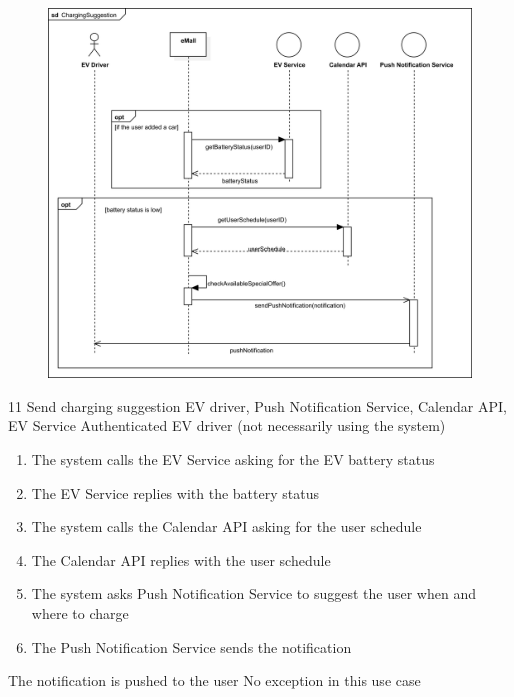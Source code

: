 \usecase
{
    \begin{figure}[H]
        \centering
        \includegraphics[scale=0.9]{src/sequence_diagram/chargeSuggestion.png}
    \end{figure}
}
{11}
{Send charging suggestion}
{EV driver, Push Notification Service, Calendar API, EV Service}
{Authenticated EV driver (not necessarily using the system)}
{
    \begin{enumerate}
        \item The system calls the EV Service asking for the EV battery status
        \item The EV Service replies with the battery status
        \item The system calls the Calendar API asking for the user schedule
        \item The Calendar API replies with the user schedule
        \item The system asks Push Notification Service to suggest the user when and where to charge
        \item The Push Notification Service sends the notification
    \end{enumerate}
}
{The notification is pushed to the user}
{
    No exception in this use case
}
{
}

